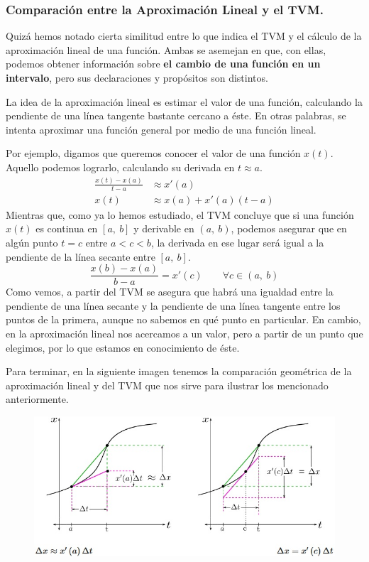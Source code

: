 \documentclass[12pt]{article}
\begin{document}
\subsubsection{Comparación entre la Aproximación Lineal y el TVM.}

Quizá hemos notado cierta similitud entre lo que indica el TVM y el cálculo de la aproximación lineal de una función. Ambas se asemejan en que, con ellas, podemos obtener información sobre \textbf{el cambio de una función en un intervalo}, pero sus declaraciones y propósitos son distintos.

La idea de la aproximación lineal es estimar el valor de una función, calculando la pendiente de una línea tangente bastante cercano a éste. En otras palabras, se intenta aproximar una función general por medio de una función lineal.

Por ejemplo, digamos que queremos conocer el valor de una función $x(t)$. Aquello podemos lograrlo, calculando su derivada en $t \approx a$.
\begin{align*}
  \frac{x(t) - x(a)}{t - a} &\approx x'(a) \\
  x(t) &\approx x(a) + x'(a)(t - a)
\end{align*}
Mientras que, como ya lo hemos estudiado, el TVM concluye que si una función $x(t)$ es continua en $[a, \ b]$ y derivable en $(a, \ b)$, podemos asegurar que en algún punto $t = c$ entre $a < c < b$, la derivada en ese lugar será igual a la pendiente de la línea secante entre $[a, \ b]$.
\[
  \frac{x(b) - x(a)}{b - a} = x'(c) \qquad \forall c \in (a, \ b)
\]
Como vemos, a partir del TVM se asegura que habrá una igualdad entre la pendiente de una línea secante y la pendiente de una línea tangente entre los puntos de la primera, aunque no sabemos en qué punto en particular. En cambio, en la aproximación lineal nos acercamos a un valor, pero a partir de un punto que elegimos, por lo que estamos en conocimiento de éste.

Para terminar, en la siguiente imagen tenemos la comparación geométrica de la aproximación lineal y del TVM que nos sirve para ilustrar los mencionado anteriormente.

\begin{figure}[hbt!]
\centering
\includegraphics[scale=0.5]{img/mean-value-theo-linear-approx.jpg}
\end{figure}
\end{document}
